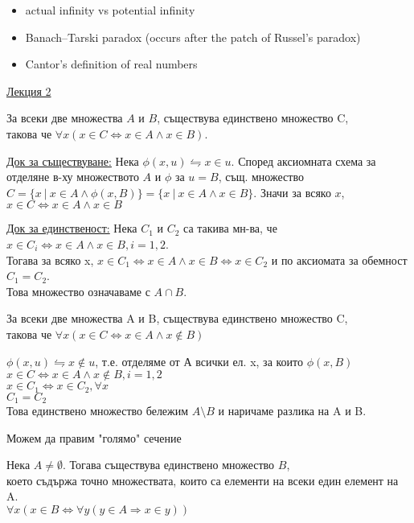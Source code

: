 \documentclass[fleqn, titlepage, 12pt]{report}
\begin{document}
\begin{itemize}
  \item actual infinity vs potential infinity
  \item Banach–Tarski paradox (occurs after the patch of Russel's paradox)
  \item Cantor's definition of real numbers
\end{itemize}
\bigbreak

\clearpage
\begin{center}
  \underline{\huge\normalfont Лекция 2}
\end{center}
\bigbreak

 За всеки две множества $A$ и $B$, съществува единствено множество C,\\
такова че $ \forall{x}(x \in C \Leftrightarrow x \in A \land x \in B)$.
\bigbreak

\underline{Док за съществуване:} Нека $\phi(x,u) \leftrightharpoons x \in u$.
Според аксиомната схема за отделяне в-ху множеството $A$ и $\phi$ за $u = B$,
същ. множество $ C = \{x\ |\ x \in A \land \phi(x,B)\} = \{x\ |\ x \in A \land x \in B\}$. Значи за всяко $x$,
$x \in C \Leftrightarrow x \in A \land x \in B$
\bigbreak

\underline{Док за единственост:} Нека $C_1$ и $C_2$ са такива мн-ва, че
$x \in C_i \Leftrightarrow x \in A \land x \in B, i = 1, 2$. \\
Тогава за всяко x,
$x \in C_1 \Leftrightarrow x \in A \land x \in B \Leftrightarrow x \in C_2$ и по аксиомата за обемност $C_1 = C_2$.\\
Това множество означаваме с $A \cap B$.
\bigbreak

 За всеки две множества A и B, съществува единствено множество C,\\
такова че $ \forall{x}(x \in C \Leftrightarrow x \in A \land x \notin B)$
\bigbreak

$\phi(x,u) \leftrightharpoons x \notin u$, т.е. отделяме от А всички ел. x, за които $\phi(x,B)$\\
$x \in C \Leftrightarrow x \in A \land x \notin B, i = 1, 2$\\
$x \in C_1 \Leftrightarrow x \in C_2, \forall{x}$\\
$C_1 = C_2$\\
Това единствено множество бележим $A \setminus B$ и наричаме разлика на A и B.
\bigbreak

Можем да правим "голямо" сечение
\bigbreak

 Нека $A \neq \emptyset$. Тогава съществува единствено множество $B$,\\
което съдържа точно множествата, които са елементи на всеки един елемент на A.\\
$ \forall{x}(x \in B \Leftrightarrow \forall{y}(y \in A \Rightarrow x \in y))$
\bigbreak
\end{document}
